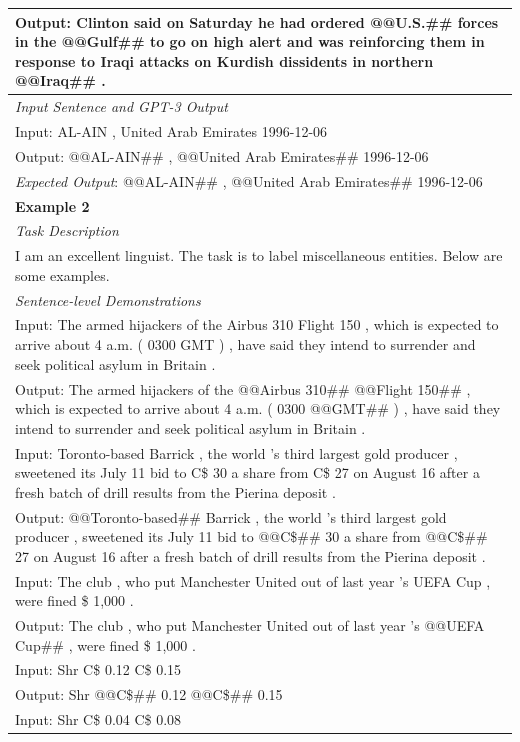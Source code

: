 \documentclass[11pt]{article}
\begin{document}
\begin{table}[th!]
{\begin{tabular}{l}
Output: Clinton said on Saturday he had ordered @@U.S.\#\# forces in the @@Gulf\#\# to go on high alert and was reinforcing them in response to Iraqi attacks on Kurdish dissidents in northern @@Iraq\#\# . \\\midrule
\textit{Input Sentence and GPT-3 Output} \\
Input: AL-AIN , United Arab Emirates 1996-12-06 \\
Output: @@AL-AIN\#\# , @@United Arab Emirates\#\# 1996-12-06 \\
{\color{blue}\it Expected Output}: @@AL-AIN\#\# , @@United Arab Emirates\#\# 1996-12-06 \\\bottomrule

\textbf{Example 2} \\\midrule
       	\textit{Task Description} \\
I am an excellent linguist. The task is to label miscellaneous entities. Below are some examples. \\\midrule
\textit{Sentence-level Demonstrations} \\
Input: The armed hijackers of the Airbus 310 Flight 150 , which is expected to arrive about 4 a.m. ( 0300 GMT ) , have said they intend to surrender and seek political asylum in Britain . \\
Output: The armed hijackers of the @@Airbus 310\#\# @@Flight 150\#\# , which is expected to arrive about 4 a.m. ( 0300 @@GMT\#\# ) , have said they intend to surrender and seek political asylum in Britain . \\
Input: Toronto-based Barrick , the world 's third largest gold producer , sweetened its July 11 bid to C\$ 30 a share from C\$ 27 on August 16 after a fresh batch of drill results from the Pierina deposit . \\
Output: @@Toronto-based\#\# Barrick , the world 's third largest gold producer , sweetened its July 11 bid to @@C\$\#\# 30 a share from @@C\$\#\# 27 on August 16 after a fresh batch of drill results from the Pierina deposit . \\
Input: The club , who put Manchester United out of last year 's UEFA Cup , were fined \$ 1,000 . \\
Output: The club , who put Manchester United out of last year 's @@UEFA Cup\#\# , were fined \$ 1,000 . \\
Input: Shr C\$ 0.12 C\$ 0.15 \\
Output: Shr @@C\$\#\# 0.12 @@C\$\#\# 0.15 \\
Input: Shr C\$ 0.04 C\$ 0.08 \\

\end{tabular}}
\end{table}
\end{document}
